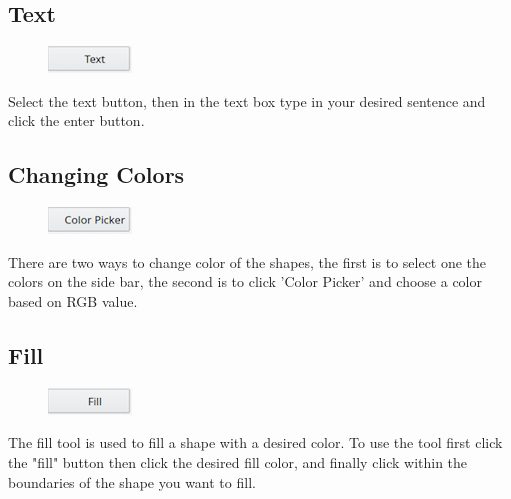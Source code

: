 \subsection{Text}
\begin{figure}[h!]
\includegraphics{text}
\end{figure}
Select the text button, then in the text box type in your desired sentence and click the enter button.

\subsection{Changing Colors}
\begin{figure}[h!]
\includegraphics{cp}
\end{figure}
There are two ways to change color of the shapes, the first is to select one the colors on the side bar, the second is to click 'Color Picker' and choose a color based on RGB value.

\subsection{Fill}
\begin{figure}[h!]
\includegraphics{fill}
\end{figure}
  The fill tool is used to fill a shape with a desired color. To use the tool first click the "fill" button then click the desired fill color, and finally click within the boundaries of the shape you want to fill.
